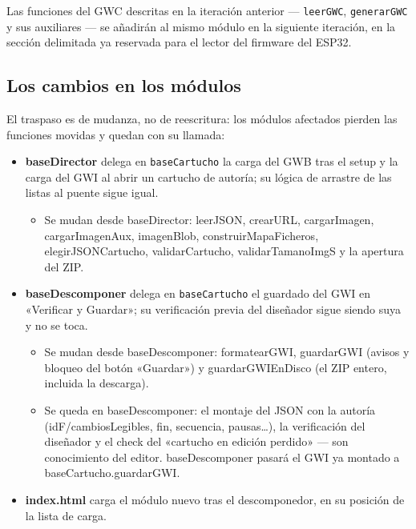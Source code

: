 Las funciones del GWC descritas en la iteración anterior —
\texttt{leerGWC}, \texttt{generarGWC} y sus auxiliares — se
añadirán al mismo módulo en la siguiente iteración, en la sección delimitada ya reservada para el lector del firmware del ESP32.

\subsection{Los cambios en los módulos}
\label{sec:F5I4Cambios}

El traspaso es de mudanza, no de reescritura: los módulos
afectados pierden las funciones movidas y quedan con su llamada:

\begin{itemize}
	\item \textbf{baseDirector} delega en \texttt{baseCartucho} la
	carga del GWB tras el setup y la carga del GWI al abrir un
	cartucho de autoría; su lógica de arrastre de las listas al
	puente sigue igual. 
	
	\begin{itemize}
		\item Se mudan desde baseDirector: leerJSON, crearURL, cargarImagen, cargarImagenAux, imagenBlob, construirMapaFicheros, elegirJSONCartucho, validarCartucho, validarTamanoImgS y la apertura del ZIP.
	\end{itemize}
	
	\item \textbf{baseDescomponer} delega en \texttt{baseCartucho}
	el guardado del GWI en «Verificar y Guardar»; su verificación
	previa del diseñador sigue siendo suya y no se toca.
		\begin{itemize}
			\item Se mudan desde baseDescomponer: formatearGWI, guardarGWI (avisos y bloqueo del botón «Guardar») y guardarGWIEnDisco (el ZIP entero, incluida la descarga).
			
			\item Se queda en baseDescomponer: el montaje del JSON con la autoría (idF/cambiosLegibles, fin, secuencia, pausas…), la verificación del diseñador y el check del «cartucho en edición perdido» — son conocimiento del editor. baseDescomponer pasará el GWI ya montado a baseCartucho.guardarGWI.		
		\end{itemize}
	
	\item \textbf{index.html} carga el módulo nuevo tras el
	descomponedor, en su posición de la lista de carga.
\end{itemize}

